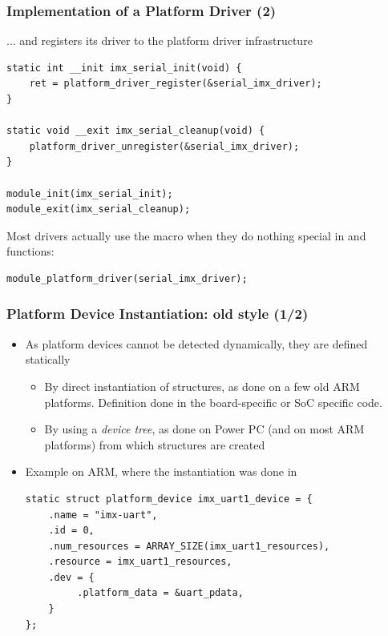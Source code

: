 \begin{frame}[fragile]
  \frametitle{Implementation of a Platform Driver (2)}
  ... and registers its driver to the platform driver infrastructure
  \begin{block}{}
  \begin{verbatim}
static int __init imx_serial_init(void) {
    ret = platform_driver_register(&serial_imx_driver);
}

static void __exit imx_serial_cleanup(void) {
    platform_driver_unregister(&serial_imx_driver);
}

module_init(imx_serial_init);
module_exit(imx_serial_cleanup);
  \end{verbatim}
\end{block}
Most drivers actually use the 
macro when they do nothing special in  and  functions:
  \begin{block}{}
  \begin{verbatim}
module_platform_driver(serial_imx_driver);
  \end{verbatim}
\end{block}
\end{frame}

\begin{frame}[fragile]
  \frametitle{Platform Device Instantiation: old style (1/2)}
  \begin{itemize}
  \item As platform devices cannot be detected dynamically, they are
    defined statically
    \begin{itemize}
    \item By direct instantiation of 
      structures, as done on a few old ARM platforms. Definition done in
      the board-specific or SoC specific code.
    \item By using a \emph{device tree}, as done on Power PC (and on
      most ARM platforms) from which 
      structures are created
    \end{itemize}
  \item Example on ARM, where the instantiation was done in
    \begin{block}{}
\begin{verbatim}
static struct platform_device imx_uart1_device = {
    .name = "imx-uart",
    .id = 0,
    .num_resources = ARRAY_SIZE(imx_uart1_resources),
    .resource = imx_uart1_resources,
    .dev = {
         .platform_data = &uart_pdata,
    }
};
\end{verbatim}
\end{block}
\end{itemize}
\end{frame}


